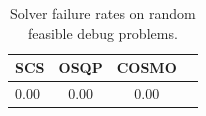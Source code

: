 \begin{table}
\centering
\caption{Solver failure rates on random feasible debug problems.}
\label{t-random feasible debug-failure}
\begin{tabular}{lccc}
\toprule
 SCS &  OSQP &  COSMO \\
\midrule
0.00 &  0.00 &   0.00 \\
\bottomrule
\end{tabular}
\end{table}
